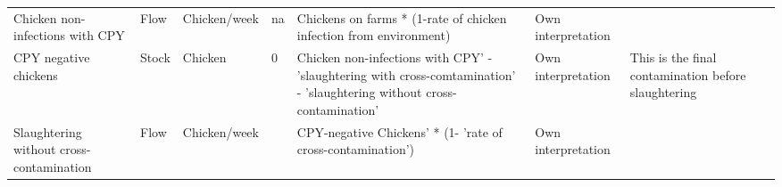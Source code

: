 \begin{landscape}
\begin{longtable}[c]{m{10em}lllm{15em}lll}
Chicken non-infections with CPY               & Flow     & Chicken/week             & na                        & Chickens on farms * (1-rate of chicken infection from environment)                                                                                                                                                                                                                       & Own interpretation                                                                                                                                                                           &                                                                                                                                                                                                                                       \\
CPY negative chickens                         & Stock    & Chicken                  & 0                         & Chicken non-infections with CPY' - 'slaughtering with cross-comtamination' - 'slaughtering without cross-contamination'                                                                                                                                                                  & Own interpretation                                                                                                                                                                           & This is the final contamination before slaughtering                                                                                                                                                                                   \\
Slaughtering without cross-contamination      & Flow     & Chicken/week             &                           & CPY-negative Chickens' * (1- 'rate of cross-contamination')                                                                                                                                                                                                                              & Own interpretation                                                                                                                                                                           &                                                                                                                                                                                                                                       \\

\end{longtable}
\end{landscape}
